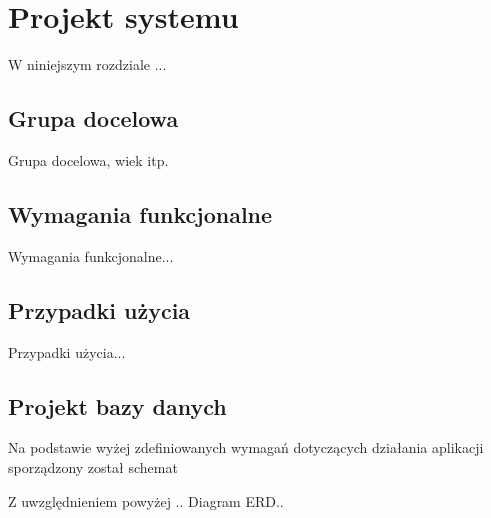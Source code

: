 \chapter{Projekt systemu}

W niniejszym rozdziale ...

\section{Grupa docelowa}

Grupa docelowa, wiek itp.

\section{Wymagania funkcjonalne}

Wymagania funkcjonalne...

\section{Przypadki użycia}

Przypadki użycia...

\section{Projekt bazy danych}

Na podstawie wyżej zdefiniowanych wymagań dotyczących działania aplikacji sporządzony został schemat 

Z uwzględnieniem powyżej .. Diagram ERD..
